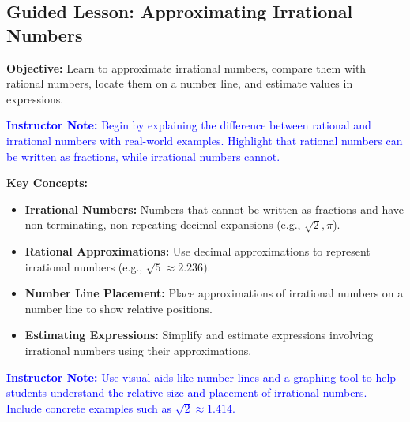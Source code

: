 \documentclass[12pt]{article}
\title{}
\date{}
\begin{document}
\subsection*{Guided Lesson: Approximating Irrational Numbers}
\onehalfspacing

\begin{tcolorbox}[colframe=black!40, colback=gray!5, 
coltitle=black, colbacktitle=black!20, fonttitle=\bfseries\Large, 
title=Learning Objective, halign title=center, left=5pt, right=5pt, top=5pt, bottom=15pt]
\textbf{Objective:} Learn to approximate irrational numbers, compare them with rational numbers, locate them on a number line, and estimate values in expressions.

\textcolor{blue}{\textbf{Instructor Note:}} \textcolor{blue}{Begin by explaining the difference between rational and irrational numbers with real-world examples. Highlight that rational numbers can be written as fractions, while irrational numbers cannot.}
\end{tcolorbox}

\begin{tcolorbox}[colframe=black!60, colback=white, 
coltitle=black, colbacktitle=black!15, fonttitle=\bfseries\Large, 
title=Key Concepts and Vocabulary, halign title=center, left=10pt, right=10pt, top=10pt, bottom=15pt]
\textbf{Key Concepts:}
\begin{itemize}
    \item \textbf{Irrational Numbers:} Numbers that cannot be written as fractions and have non-terminating, non-repeating decimal expansions (e.g., \( \sqrt{2}, \pi \)).
    \item \textbf{Rational Approximations:} Use decimal approximations to represent irrational numbers (e.g., \( \sqrt{5} \approx 2.236 \)).
    \item \textbf{Number Line Placement:} Place approximations of irrational numbers on a number line to show relative positions.
    \item \textbf{Estimating Expressions:} Simplify and estimate expressions involving irrational numbers using their approximations.
\end{itemize}

\textcolor{blue}{\textbf{Instructor Note:}} \textcolor{blue}{Use visual aids like number lines and a graphing tool to help students understand the relative size and placement of irrational numbers. Include concrete examples such as \( \sqrt{2} \approx 1.414 \).}
\end{tcolorbox}
\end{document}
